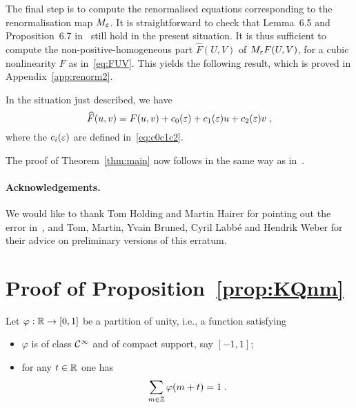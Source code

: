 \documentclass[reqno,11pt]{article}
\begin{document}
The final step is to compute the renormalised equations corresponding to the 
renormalisation map $M_\varepsilon$. It is straightforward to check that Lemma~6.5 and 
Proposition~6.7 in~\cite{BK2016} still hold in the present situation. It is 
thus sufficient to compute the non-positive-homogeneous part $\widehat F(U,V)$ 
of $M_\varepsilon F(U,V)$, for a cubic nonlinearity $F$ as in~\eqref{eq:FUV}. This 
yields the following result, which is proved in 
Appendix~\ref{app:renorm2}. 

\begin{prop}
\label{prop:Fhat} 
In the situation just described, we have 
\begin{equation}
 \widehat F(u,v) 
 = F(u,v) + c_0(\varepsilon) + c_1(\varepsilon)u + c_2(\varepsilon)v\;,
\end{equation} 
where the $c_i(\varepsilon)$ are defined in~\eqref{eq:c0c1c2}. 
\end{prop}

The proof of Theorem~\ref{thm:main} now follows in the same way as 
in~\cite[Sec.~7]{BK2016}. 


\paragraph*{Acknowledgements.}

We would like to thank Tom Holding and Martin Hairer for pointing out the error 
in~\cite[Lem.~4.8]{BK2016}, and Tom, Martin, Yvain Bruned, Cyril Labb\'e and 
Hendrik Weber for their advice on preliminary versions of this erratum. 


\appendix

\section{Proof of Proposition~\ref{prop:KQnm}}
\label{app:KQnm} 

Let $\varphi:\mathbb{R}\to[0,1]$ be a partition of unity, i.e., a
function satisfying
\begin{itemize}
\item	$\varphi$ is of class ${\mathcal C}^\infty$ and of compact support, say $[-1,1]$;
\item	for any $t\in\mathbb{R}$ one has 
\begin{equation}
 \sum_{m\in\mathbb{Z}} \varphi(m+t) = 1\;.
\end{equation} 
\end{itemize}
\end{document}
